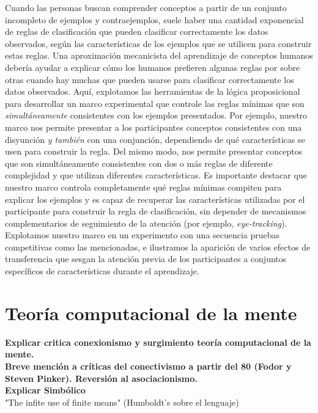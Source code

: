 Cuando las personas buscan comprender conceptos a partir de un conjunto incompleto de ejemplos y contraejemplos, suele haber una cantidad exponencial de reglas de clasificación que pueden clasificar correctamente los datos observados, según las características de los ejemplos que se utilicen para construir estas reglas. Una aproximación mecanicista del aprendizaje de conceptos humanos debería ayudar a explicar cómo los humanos prefieren algunas reglas por sobre otras cuando hay muchas que pueden usarse para clasificar correctamente los datos observados. Aquí, explotamos las herramientas de la lógica proposicional para desarrollar un marco experimental que controle las reglas mínimas que son \textit{simultáneamente} consistentes con los ejemplos presentados. Por ejemplo, nuestro marco nos permite presentar a los participantes conceptos consistentes con una disyunción \textit{y también} con una conjunción, dependiendo de qué características se usen para construir la regla. Del mismo modo, nos permite presentar conceptos que son simultáneamente consistentes con dos o más reglas de diferente complejidad y que utilizan diferentes características. Es importante destacar que nuestro marco controla completamente qué reglas mínimas compiten para explicar los ejemplos y es capaz de recuperar las características utilizadas por el participante para construir la regla de clasificación, sin depender de mecanismos complementarios de seguimiento de la atención (por ejemplo, {\em eye-tracking}). Explotamos nuestro marco en un experimento con una secuencia pruebas competitivas como las mencionadas, e ilustramos la aparición de varios efectos de transferencia que sesgan la atención previa de los participantes a conjuntos específicos de características durante el aprendizaje.






\section{Teoría computacional de la mente}
\textbf{Explicar critica conexionismo y surgimiento teoría computacional de la mente.} \\
\textbf{Breve mención a críticas del conectivismo a partir del 80 (Fodor y Steven Pinker). Reversión al asociacionismo.}\\
\textbf{Explicar Simbólico}\\

"The infite use of finite means" (Humboldt's sobre el lenguaje)

